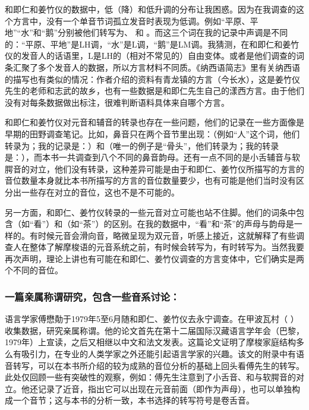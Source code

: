 和即仁和姜竹仪的数据中，低（降）和低升调的分布让我困惑。因为在我调查的这个{方言}中，没有一个{单音节词}孤立发音时表现为低调。例如“平原、平地”“水”和“鹅”分别被他们转写为、 和 。而这三个词在我的记录中声调是不同的：“平原、平地”是LH调，“水”是L调，“鹅”是LM调。我猜测，在和即仁和姜竹仪的发音人的话语里，L是LH的（相对不常见的）自由变体。或者是他们调查的词条汇聚了多个发音人的数据，所以{方言}材料不同质。《纳西语简志》里有关纳西语的描写也有类似的情况：作者介绍的资料有青龙镇的{方言}（今长水），这是姜竹仪先生的老师和志武的故乡，也有一些数据是和即仁先生自己的漾西{方言}。由于他们没有对每条数据做出标注，很难判断语料具体来自哪个{方言}。

和即仁和姜竹仪对元音和辅音的转录也{存在}一些问题，他们的记录在一些方面像是早期的田野调查笔记。比如，鼻音只在两个音节里出现：（例如“人”这个词，他们转录为；我的记录是：）和（唯一的例子是“骨头”，他们转录为；我的转录是：），而本书一共调查到八个不同的鼻音韵母。还有一点不同的是小舌辅音与软腭音的对立，他们没有转录，这种差异可能是由于和即仁、姜竹仪所描写的{方言}的音位数量本身就比本书所描写的{方言}的音位数量要少，也有可能是他们当时没有区分出一些{存在}对立的音位，这也不是不可能的。

另一方面，和即仁、姜竹仪转录的一些元音对立可能也站不住脚。他们的词条中包含（如“看”）和（如“茶”）的区别。在我的数据中，“看”和“茶”的声母与韵母是一样的。有时候元音会滑向音，略微呈现为双元音，听感上接近，这就解释了有些调查人在整体了解摩梭语的元音系统之前，有时候会转写为，有时转写为。当然我要再次声明，理论上讲也有可能在和即仁、姜竹仪调查的{方言}变体中，它们确实是两个不同的音位。

\subsubsection{一篇亲属称谓研究，包含一些音系讨论：\textcite{fu1980}}
\label{sec:fu1980astudyofkinshipterms}

语言学家傅懋勣于1979年5至6月随和即仁、姜竹仪去永宁调查。在甲波瓦村（ ）收集数据，研究亲属称谓。他的论文首先在第十二届国际汉藏语言学年会（巴黎，1979年）上宣读，之后又相继以中文和法文发表\parencite{fu1980,fu1983}。这篇论文证明了摩梭家庭结构多么有吸引力，在专业的人类学家之外还能引起语言学家的兴趣。该文的附录中有语音转写，可以在本书所介绍的较为成熟的音位分析的基础上回头看傅先生的转写。此处仅回顾一些有突破性的观察，例如：傅先生注意到了小舌音、和与软腭音的对立。他还记录了近音，指出它可以出现在元音前面（即作为声母），也可以{单独}构成一个音节；这与本书的分析一致，本书选择的转写符号是卷舌音。

